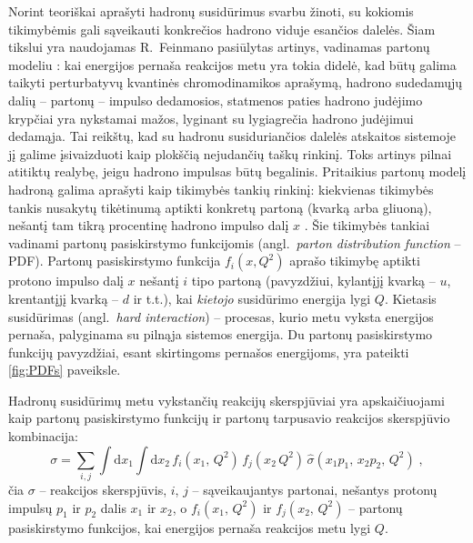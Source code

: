 \documentclass[a4paper, 12pt, oneside]{article}
\newlength\q
\begin{document}
Norint teoriškai aprašyti hadronų susidūrimus svarbu žinoti, su kokiomis tikimybėmis gali sąveikauti konkrečios
hadrono viduje esančios dalelės.
Šiam tikslui yra naudojamas R.~Feinmano pasiūlytas artinys, vadinamas partonų modeliu \cite{FeynPartons}:
kai energijos pernaša reakcijos metu yra tokia didelė, kad būtų galima taikyti perturbatyvų kvantinės chromodinamikos aprašymą,
hadrono sudedamųjų dalių -- partonų -- impulso dedamosios, statmenos paties hadrono judėjimo krypčiai yra nykstamai mažos,
lyginant su lygiagrečia hadrono judėjimui dedamąja.
Tai reikštų, kad su hadronu susiduriančios dalelės atskaitos sistemoje jį galime įsivaizduoti kaip plokščią nejudančių
taškų rinkinį.
Toks artinys pilnai atitiktų realybę, jeigu hadrono impulsas būtų begalinis.
Pritaikius partonų modelį hadroną galima aprašyti kaip tikimybės tankių rinkinį: kiekvienas tikimybės tankis nusakytų tikėtinumą
aptikti konkretų partoną (kvarką arba gliuoną), nešantį tam tikrą procentinę hadrono impulso dalį $x$ \cite{BjorkPartons}.
Šie tikimybės tankiai vadinami partonų pasiskirstymo funkcijomis (angl.\ \textit{parton distribution function} -- PDF).
Partonų pasiskirstymo funkcija $f_{i}(x, Q^{2})$ aprašo tikimybę aptikti protono impulso
dalį $x$ nešantį $i$ tipo partoną (pavyzdžiui, kylantįjį kvarką -- $u$, krentantįjį
kvarką -- $d$ ir t.t.), kai \textit{kietojo} susidūrimo energija lygi $Q$.
Kietasis susidūrimas (angl.\ \textit{hard interaction}) -- procesas, kurio metu vyksta energijos pernaša, palyginama
su pilnąja sistemos energija.
Du partonų pasiskirstymo funkcijų pavyzdžiai, esant skirtingoms pernašos energijoms, yra pateikti
\ref{fig:PDFs} paveiksle.

Hadronų susidūrimų metu vykstančių reakcijų skerspjūviai yra apskaičiuojami kaip partonų pasiskirstymo
funkcijų ir partonų tarpusavio reakcijos skerspjūvio kombinacija:
\begin{equation}
	\sigma = \sum_{i, j} \int \mathrm{d}x_1 \int \mathrm{d}x_2 \,
	f_{i}(x_1, \, Q^2) \, f_{j}(x_2 \, Q^2) \, \hat{\sigma}(x_1 p_1, \, x_2 p_2, \, Q^2) \; \mathrm{,}
	\label{eq:PDFxsec}
\end{equation}
čia $\sigma$ -- reakcijos skerspjūvis, $i$, $j$ -- sąveikaujantys partonai, nešantys protonų impulsų $p_1$ ir $p_2$
dalis $x_1$ ir $x_2$, o $f_{i}(x_1, \, Q^2)$ ir $f_{j}(x_2, \, Q^2)$ -- partonų pasiskirstymo funkcijos, kai
energijos pernaša reakcijos metu lygi $Q$.
\end{document}
